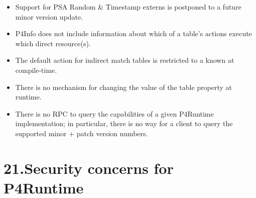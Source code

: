 \documentclass[11pt]{article}
\begin{document}
{\begin{itemize}
\begin{itemize}[noitemsep,topsep=\mdcompacttopsep]
\item{}a  or  with an underlying type that is one of the above (or
in general a \textquotedblleft{}chain\textquotedblright{} of  and/or  that eventually ends with
one of the types above)%
\end{itemize}%

\item{}
Support for PSA Random \& Timestamp externs is postponed to a future minor
version update.%

\item{}
P4Info does not include information about which of a table's actions execute
which direct resource(s).%

\item{}
The default action for indirect match tables is restricted to a  known at compile-time.%

\item{}
There is no mechanism for changing the value of the 
table property at runtime.%

\item{}
There is no RPC to query the capabilities of a given P4Runtime implementation;
in particular, there is no way for a client to query the supported minor +
patch version numbers.%
\end{itemize}%

\section{21.\hspace*{0.5em}Security concerns for P4Runtime}\label{sec-security-concerns-for-p4runtime}%

}
\end{document}
